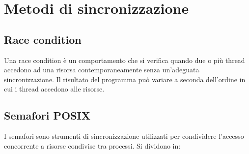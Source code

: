 \newpage
\section{Metodi di sincronizzazione}
\subsection{Race condition}
Una race condition è un comportamento che si verifica quando due o più thread accedono ad una risorsa contemporaneamente senza un'adeguata sincronizzazione. Il risultato del programma può variare a seconda dell'ordine in cui i thread accedono alle risorse.
\subsection{Semafori POSIX}
I semafori sono strumenti di sincronizzazione utilizzati per condividere l'accesso concorrente a risorse condivise tra processi. Si dividono in:
